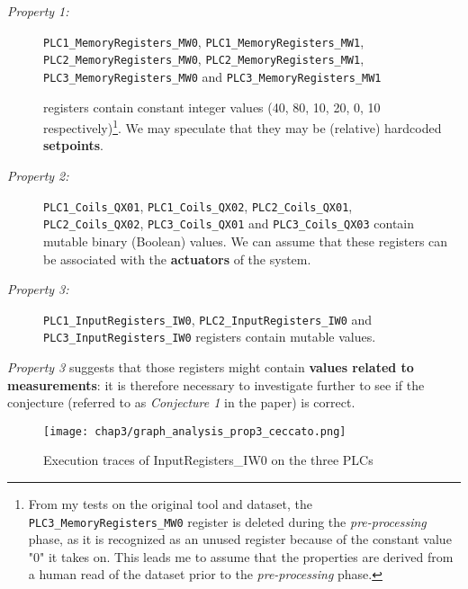 \begin{description}
	\item[\colorbox{backcolourtext}{\textnormal{\textit{Property 1:}}}] \texttt{PLC1\_MemoryRegisters\_MW0},  \texttt{PLC1\_MemoryRegisters\_MW1}, \\ \texttt{PLC2\_MemoryRegisters\_MW0},  \texttt{PLC2\_MemoryRegisters\_MW1}, \\ 
	\texttt{PLC3\_MemoryRegisters\_MW0} and 
	\texttt{PLC3\_MemoryRegisters\_MW1}
 
	registers contain constant integer values (40, 80, 10, 20, 0, 10 respectively)\footnote{From my tests on the original tool and dataset, the \texttt{PLC3\_MemoryRegisters\_MW0} register is deleted during the \textit{pre-processing} phase, as it is recognized as an unused register because of the constant value "0" it takes on. This leads me to assume that the properties are derived from a human read of the dataset prior to the \textit{pre-processing} phase.}. We may speculate that they may be (relative) hardcoded \textbf{setpoints}.
	
	\item[\colorbox{backcolourtext}{\textnormal{\textit{Property 2:}}}] \texttt{PLC1\_Coils\_QX01}, \texttt{PLC1\_Coils\_QX02}, \texttt{PLC2\_Coils\_QX01}, \\ \texttt{PLC2\_Coils\_QX02}, \texttt{PLC3\_Coils\_QX01} and \texttt{PLC3\_Coils\_QX03} contain mutable binary (Boolean) values.
	We can assume that these registers can be associated with the \textbf{actuators} of the system.
	
	\item[\colorbox{backcolourtext}{\textnormal{\textit{Property 3:}}}] \texttt{PLC1\_InputRegisters\_IW0},
	\texttt{PLC2\_InputRegisters\_IW0} and \\ \texttt{PLC3\_InputRegisters\_IW0} registers contain mutable values.
\end{description}

\textit{Property 3} suggests that those registers might contain \textbf{values related to measurements}: it is therefore necessary to investigate further to see if the conjecture (referred to as \textit{Conjecture 1} in the paper) is correct.

\begin{figure}[ht]
	\centering
	\texttt{[image: chap3/graph\_analysis\_prop3\_ceccato.png]}
	\caption{Execution traces of InputRegisters\_IW0 on the three PLCs}
	\label{fig:graph_analysis_prop3}
\end{figure}

